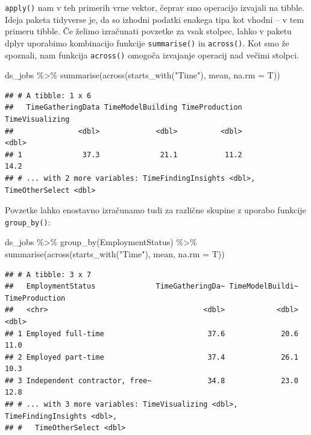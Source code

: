 \documentclass[
]{book}
\newenvironment{Shaded}{\begin{snugshade}}{\end{snugshade}}
\newcommand{\AttributeTok}[1]{\textcolor[rgb]{0.77,0.63,0.00}{#1}}
\newcommand{\FunctionTok}[1]{\textcolor[rgb]{0.00,0.00,0.00}{#1}}
\newcommand{\NormalTok}[1]{#1}
\newcommand{\SpecialCharTok}[1]{\textcolor[rgb]{0.00,0.00,0.00}{#1}}
\newcommand{\StringTok}[1]{\textcolor[rgb]{0.31,0.60,0.02}{#1}}
\begin{document}
\texttt{apply()} nam v teh primerih vrne vektor, čeprav smo operacijo izvajali na tibble. Ideja paketa tidyverse je, da so izhodni podatki enakega tipa kot vhodni -- v tem primeru tibble. Če želimo izračunati povzetke za vsak stolpec, lahko v paketu dplyr uporabimo kombinacijo funkcije \texttt{summarise()} in \texttt{across()}. Kot smo že spoznali, nam funkcija \texttt{across()} omogoča izvajanje operacij nad večimi stolpci.

\begin{Shaded}
\begin{Highlighting}[]
\NormalTok{ds\_jobs }\SpecialCharTok{\%\textgreater{}\%}
  \FunctionTok{summarise}\NormalTok{(}\FunctionTok{across}\NormalTok{(}\FunctionTok{starts\_with}\NormalTok{(}\StringTok{"Time"}\NormalTok{), mean, }\AttributeTok{na.rm =}\NormalTok{ T))}
\end{Highlighting}
\end{Shaded}

\begin{verbatim}
## # A tibble: 1 x 6
##   TimeGatheringData TimeModelBuilding TimeProduction TimeVisualizing
##               <dbl>             <dbl>          <dbl>           <dbl>
## 1              37.3              21.1           11.2            14.2
## # ... with 2 more variables: TimeFindingInsights <dbl>, TimeOtherSelect <dbl>
\end{verbatim}

Povzetke lahko enostavno izračunamo tudi za različne skupine z uporabo funkcije \texttt{group\_by()}:

\begin{Shaded}
\begin{Highlighting}[]
\NormalTok{ds\_jobs }\SpecialCharTok{\%\textgreater{}\%}
  \FunctionTok{group\_by}\NormalTok{(EmploymentStatus) }\SpecialCharTok{\%\textgreater{}\%}
  \FunctionTok{summarise}\NormalTok{(}\FunctionTok{across}\NormalTok{(}\FunctionTok{starts\_with}\NormalTok{(}\StringTok{"Time"}\NormalTok{), mean, }\AttributeTok{na.rm =}\NormalTok{ T))}
\end{Highlighting}
\end{Shaded}

\begin{verbatim}
## # A tibble: 3 x 7
##   EmploymentStatus              TimeGatheringDa~ TimeModelBuildi~ TimeProduction
##   <chr>                                    <dbl>            <dbl>          <dbl>
## 1 Employed full-time                        37.6             20.6           11.0
## 2 Employed part-time                        37.4             26.1           10.3
## 3 Independent contractor, free~             34.8             23.0           12.8
## # ... with 3 more variables: TimeVisualizing <dbl>, TimeFindingInsights <dbl>,
## #   TimeOtherSelect <dbl>
\end{verbatim}
\end{document}
